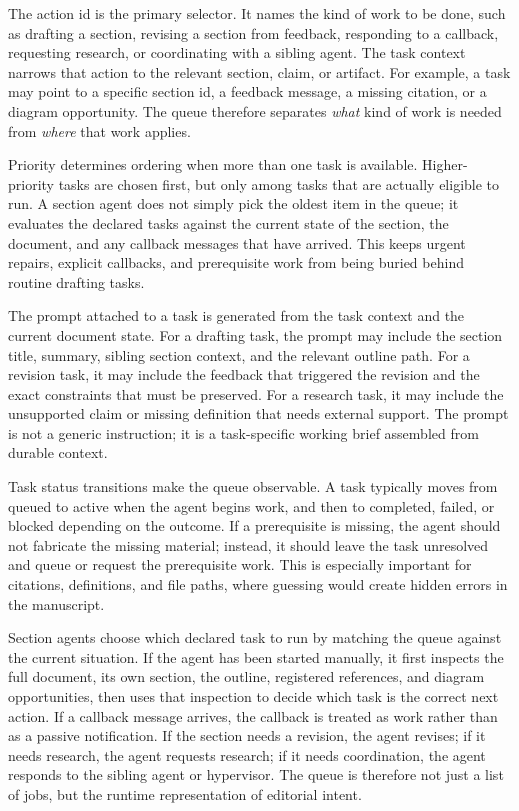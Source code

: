 \documentclass[11pt]{article}
\begin{document}
The action id is the primary selector. It names the kind of work to be done, such as drafting a section, revising a section from feedback, responding to a callback, requesting research, or coordinating with a sibling agent. The task context narrows that action to the relevant section, claim, or artifact. For example, a task may point to a specific section id, a feedback message, a missing citation, or a diagram opportunity. The queue therefore separates \emph{what} kind of work is needed from \emph{where} that work applies.

Priority determines ordering when more than one task is available. Higher-priority tasks are chosen first, but only among tasks that are actually eligible to run. A section agent does not simply pick the oldest item in the queue; it evaluates the declared tasks against the current state of the section, the document, and any callback messages that have arrived. This keeps urgent repairs, explicit callbacks, and prerequisite work from being buried behind routine drafting tasks.

The prompt attached to a task is generated from the task context and the current document state. For a drafting task, the prompt may include the section title, summary, sibling section context, and the relevant outline path. For a revision task, it may include the feedback that triggered the revision and the exact constraints that must be preserved. For a research task, it may include the unsupported claim or missing definition that needs external support. The prompt is not a generic instruction; it is a task-specific working brief assembled from durable context.

Task status transitions make the queue observable. A task typically moves from queued to active when the agent begins work, and then to completed, failed, or blocked depending on the outcome. If a prerequisite is missing, the agent should not fabricate the missing material; instead, it should leave the task unresolved and queue or request the prerequisite work. This is especially important for citations, definitions, and file paths, where guessing would create hidden errors in the manuscript.

Section agents choose which declared task to run by matching the queue against the current situation. If the agent has been started manually, it first inspects the full document, its own section, the outline, registered references, and diagram opportunities, then uses that inspection to decide which task is the correct next action. If a callback message arrives, the callback is treated as work rather than as a passive notification. If the section needs a revision, the agent revises; if it needs research, the agent requests research; if it needs coordination, the agent responds to the sibling agent or hypervisor. The queue is therefore not just a list of jobs, but the runtime representation of editorial intent.
\end{document}
